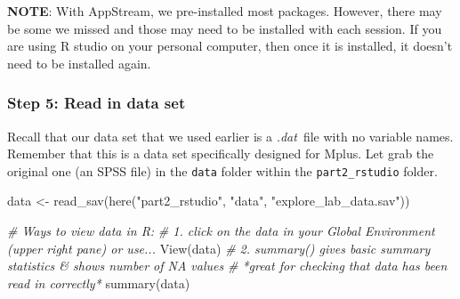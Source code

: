 \documentclass[
]{article}
\newenvironment{Shaded}{\begin{snugshade}}{\end{snugshade}}
\newcommand{\CommentTok}[1]{\textcolor[rgb]{0.56,0.35,0.01}{\textit{#1}}}
\newcommand{\FunctionTok}[1]{\textcolor[rgb]{0.00,0.00,0.00}{#1}}
\newcommand{\NormalTok}[1]{#1}
\newcommand{\OtherTok}[1]{\textcolor[rgb]{0.56,0.35,0.01}{#1}}
\newcommand{\StringTok}[1]{\textcolor[rgb]{0.31,0.60,0.02}{#1}}
\begin{document}
\textbf{NOTE}: With AppStream, we pre-installed most packages. However,
there may be some we missed and those may need to be installed with each
session. If you are using R studio on your personal computer, then once
it is installed, it doesn't need to be installed again.

\hypertarget{step-5-read-in-data-set}{%
\subsubsection{Step 5: Read in data set}\label{step-5-read-in-data-set}}

Recall that our data set that we used earlier is a \emph{.dat}~file with
no variable names. Remember that this is a data set specifically
designed for Mplus. Let grab the original one (an SPSS file) in the
\texttt{data} folder within the \texttt{part2\_rstudio} folder.

\begin{Shaded}
\begin{Highlighting}[]
\NormalTok{data }\OtherTok{\textless{}{-}} \FunctionTok{read\_sav}\NormalTok{(}\FunctionTok{here}\NormalTok{(}\StringTok{"part2\_rstudio"}\NormalTok{, }\StringTok{"data"}\NormalTok{, }\StringTok{"explore\_lab\_data.sav"}\NormalTok{))}

\CommentTok{\# Ways to view data in R:}
\CommentTok{\# 1. click on the data in your Global Environment (upper right pane) or use...}
\FunctionTok{View}\NormalTok{(data)}
\CommentTok{\# 2. summary() gives basic summary statistics \& shows number of NA values}
\CommentTok{\# *great for checking that data has been read in correctly*}
\FunctionTok{summary}\NormalTok{(data)}
\end{Highlighting}
\end{Shaded}
\end{document}
